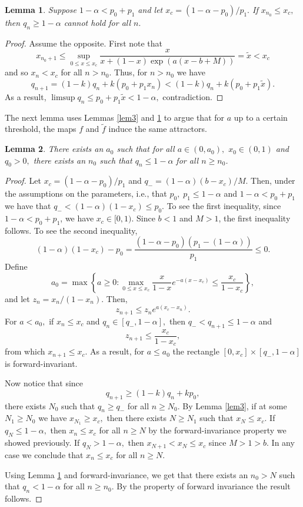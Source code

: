 \documentclass{article}
\theoremstyle{plain}
\newtheorem{lemma}{Lemma}
\theoremstyle{definition}
\begin{document}
\begin{lemma}\label{lem4}
Suppose $1-\alpha< p_0+p_1$ and let $x_c=(1-\alpha-p_0)/p_1.$ If $x_{n_0}\leq x_c,$ then $q_n\geq1-\alpha$ cannot hold for all $n.$
\end{lemma}

\begin{proof}
Assume the opposite. First note that
\[
x_{n_0+1} \leq \sup_{0\leq x \leq x_c} \frac{x}{x+(1-x) \exp{\left(  a(x-b+M)\right)}}=\tilde x<x_c
\]
and so $x_n<x_c$ for all $n> n_0.$ Thus, for $n> n_0$ we have
\[
q_{n+1}=(1-k)q_n+k(p_0+p_1x_n)< (1-k)q_n +k(p_0+p_1\tilde x).
\]
As a result, $\limsup q_n\leq p_0+p_1\tilde x<  1-\alpha,$ contradiction.

\end{proof}

The next lemma uses Lemmas \ref{lem3} and \ref{lem4} to argue that for $a$ up to a certain threshold, the maps $f$ and $\tilde f$ induce the same attractors.

\begin{lemma}\label{lem5}
There exists an $a_0$ such that for all $a \in (0,a_0),$ $x_0 \in (0,1)$ and $q_0>0,$ there exists an $n_0$ such that $q_n\leq1-\alpha$ for all $n\geq n_0$.

\end{lemma}
\begin{proof}
Let $x_c=(1-\alpha-p_0)/p_1$ and $q_-=(1-\alpha)(b-x_c)/M.$ Then, under the assumptions on the parameters, i.e., that $p_0, \; p_1 \leq 1-\alpha$ and $1-\alpha<p_0+p_1$ we have that $q_-<(1-\alpha)(1-x_c)\leq p_0.$ To see the first inequality, since $1-\alpha<p_0+p_1$, we have $x_c\in[0,1)$. Since $b<1$ and $M>1$, the first inequality follows. To see the second inequality,
$$
(1-\alpha)(1-x_c)-p_0=\frac{(1-\alpha-p_0)(p_1-(1-\alpha))}{p_1}\leq0.
$$ 
Define 
\[
a_0= \max \left \{a\geq 0: \max_{0\leq x\leq x_c} \frac{x}{1-x} e^{-a(x-x_c)}\leq \frac{x_c}{1-x_c} \right\},
\]
and let $z_n=x_n/(1-x_n)$. Then, 
\[
z_{n+1}\leq z_n e^{a(x_c-x_n)}.
\]
For $a< a_0,$ if $x_n\leq x_c$ and $q_n\in[q_-,1-\alpha],$ then $q_-<q_{n+1}\leq 1-\alpha$ and 
\[
z_{n+1}\leq \frac{x_c}{1-x_c},
\]
from which $x_{n+1}\leq x_c$. As a result, for $a\leq a_0$ the rectangle $[0,x_c] \times [q_-,1-\alpha]$ is forward-invariant.

Now notice that since
\[
q_{n+1}\geq (1-k)q_n+kp_0,
\]
there exists $N_0$ such that $q_n\geq q_-$ for all $n\geq N_0$. By Lemma \ref{lem3}, if at some $N_1\geq N_0$ we have $x_{N_1}\geq x_c,$ then there exists $N\geq N_1$ such that $x_{N}\leq x_c.$ If $q_N\leq 1-\alpha,$ then $x_n \leq x_c$ for all $n\geq N$ by the forward-invariance property we showed previously. If $q_N > 1-\alpha,$ then $x_{N+1}<x_N\leq x_c$ since $M>1>b.$ In any case we conclude that $x_n \leq x_c$ for all $n\geq N.$

Using Lemma \ref{lem4} and forward-invariance, we get that there exists an $n_0>N$ such that $q_{n}<1-\alpha$ for all $n\geq n_0.$ By the property of forward invariance the result follows.

\end{proof}
\end{document}
